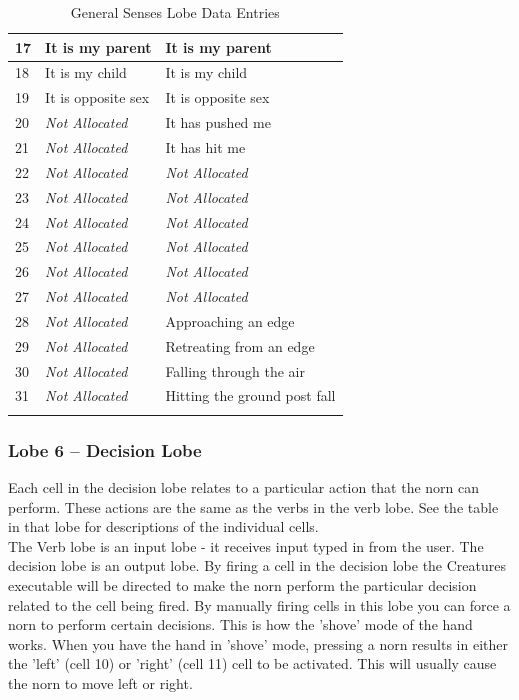 \documentclass[11pt,twoside,a4paper]{article}
\begin{document}
\begin{longtable}{|p{}|p{}|p{}|}
17	&	It is my parent		&	It is my parent		 \\ \hline
18	&	It is my child		&	It is my child		 \\ \hline
19	&	It is opposite sex	&	It is opposite sex	 \\ \hline
20	&	\emph{Not Allocated}	&	It has pushed me	 \\ \hline
21	&	\emph{Not Allocated}	&	It has hit me		 \\ \hline
22	&	\emph{Not Allocated}	&	\emph{Not Allocated}	 \\ \hline
23	&	\emph{Not Allocated}	&	\emph{Not Allocated}	 \\ \hline
24	&	\emph{Not Allocated}	&	\emph{Not Allocated}	 \\ \hline
25	&	\emph{Not Allocated}	&	\emph{Not Allocated}	 \\ \hline
26	&	\emph{Not Allocated}	&	\emph{Not Allocated}	 \\ \hline
27	&	\emph{Not Allocated}	&	\emph{Not Allocated}	 \\ \hline
28	&	\emph{Not Allocated}	&	Approaching an edge	 \\ \hline
29	&	\emph{Not Allocated}	&	Retreating from an edge	 \\ \hline
30	&	\emph{Not Allocated}	&	Falling through the air	 \\ \hline
31	&	\emph{Not Allocated}	&	Hitting the ground post fall	 \\ \hline
	\caption{General Senses Lobe Data Entries }
	\label{tab:General_Senses_Lobe_Data_Entries}\\
\end{longtable}

\subsubsection{Lobe 6 -- Decision Lobe}

Each cell in the decision lobe relates to a particular action that the norn can perform. These actions are the same as the verbs in the verb lobe. See the table in that lobe for descriptions of the individual cells.~\\

The Verb lobe is an input lobe - it receives input typed in from the user. The decision lobe is an output lobe. By firing a cell in the decision lobe the Creatures executable will be directed to make the norn perform the particular decision related to the cell being fired. By manually firing cells in this lobe you can force a norn to perform certain decisions. This is how the 'shove' mode of the hand works. When you have the hand in 'shove' mode, pressing a norn results in either the 'left' (cell 10) or 'right' (cell 11) cell to be activated. This will usually cause the norn to move left or right.~\\
\end{document}
